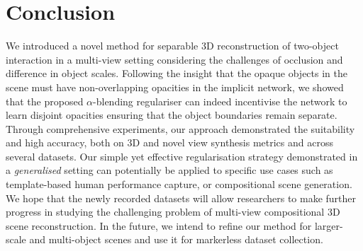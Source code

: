 \section{Conclusion}
We introduced a novel method for separable 3D reconstruction of two-object interaction in a multi-view setting considering the challenges of occlusion and difference in object scales. Following the insight that the opaque objects in the scene must have non-overlapping opacities in the implicit network, we showed that the proposed $\alpha$-blending regulariser can indeed incentivise the network to learn disjoint opacities ensuring that the object boundaries remain separate. Through comprehensive experiments, our approach demonstrated the suitability and high accuracy, both on 3D and novel view synthesis metrics and across several datasets. Our simple yet effective regularisation strategy demonstrated in a \textit{generalised} setting can potentially be applied to specific use cases such as template-based human performance capture, or compositional scene generation. We hope that the newly recorded datasets will allow researchers to make further progress in studying the challenging problem of multi-view compositional 3D scene reconstruction. In the future, we intend to refine our method for larger-scale and multi-object scenes and use it for markerless dataset collection. 
